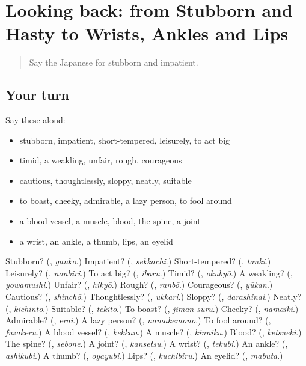 \section[(dialogue)]{Looking back: from Stubborn and Hasty to Wrists, Ankles and Lips}

\label{lesson:JA-R443-review-438-443}



\begin{quote}
Say the Japanese for stubborn and impatient.
\end{quote}

\subsection*{Your turn}
Say these aloud:

\begin{itemize}
\raggedright
  \item stubborn, impatient, short-tempered, leisurely, to act big
  \item timid, a weakling, unfair, rough, courageous
  \item cautious, thoughtlessly, sloppy, neatly, suitable
  \item to boast, cheeky, admirable, a lazy person, to fool around
  \item a blood vessel, a muscle, blood, the spine, a joint
  \item a wrist, an ankle, a thumb, lips, an eyelid
\end{itemize}

\begin{tcolorbox}[breakable,colback=teal!4,colframe=teal!35!black,title={Before you move on}]
Stubborn? (\textbf{}, \emph{ganko}.) Impatient? (\textbf{}, \emph{sekkachi}.) Short-tempered? (\textbf{}, \emph{tanki}.) Leisurely? (\textbf{}, \emph{nonbiri}.) To act big? (\textbf{}, \emph{ibaru}.) Timid? (\textbf{}, \emph{okubyō}.) A weakling? (\textbf{}, \emph{yowamushi}.) Unfair? (\textbf{}, \emph{hikyō}.) Rough? (\textbf{}, \emph{ranbō}.) Courageous? (\textbf{}, \emph{yūkan}.) Cautious? (\textbf{}, \emph{shinchō}.) Thoughtlessly? (\textbf{}, \emph{ukkari}.) Sloppy? (\textbf{}, \emph{darashinai}.) Neatly? (\textbf{}, \emph{kichinto}.) Suitable? (\textbf{}, \emph{tekitō}.) To boast? (\textbf{}, \emph{jiman suru}.) Cheeky? (\textbf{}, \emph{namaiki}.) Admirable? (\textbf{}, \emph{erai}.) A lazy person? (\textbf{}, \emph{namakemono}.) To fool around? (\textbf{}, \emph{fuzakeru}.) A blood vessel? (\textbf{}, \emph{kekkan}.) A muscle? (\textbf{}, \emph{kinniku}.) Blood? (\textbf{}, \emph{ketsueki}.) The spine? (\textbf{}, \emph{sebone}.) A joint? (\textbf{}, \emph{kansetsu}.) A wrist? (\textbf{}, \emph{tekubi}.) An ankle? (\textbf{}, \emph{ashikubi}.) A thumb? (\textbf{}, \emph{oyayubi}.) Lips? (\textbf{}, \emph{kuchibiru}.) An eyelid? (\textbf{}, \emph{mabuta}.)
\end{tcolorbox}

